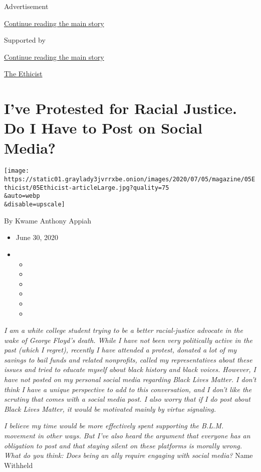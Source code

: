 Advertisement

\protect\hyperlink{after-top}{Continue reading the main story}

Supported by

\protect\hyperlink{after-sponsor}{Continue reading the main story}

\href{/column/the-ethicist}{The Ethicist}

\hypertarget{ive-protested-for-racial-justice-do-i-have-to-post-on-social-media}{%
\section{I've Protested for Racial Justice. Do I Have to Post on Social
Media?}\label{ive-protested-for-racial-justice-do-i-have-to-post-on-social-media}}

\texttt{[image: https://static01.graylady3jvrrxbe.onion/images/2020/07/05/magazine/05Ethicist/05Ethicist-articleLarge.jpg?quality=75\\\&auto=webp\\\&disable=upscale]}

By Kwame Anthony Appiah

\begin{itemize}
\item
  June 30, 2020
\item
  \begin{itemize}
  \item
  \item
  \item
  \item
  \item
  \item
  \end{itemize}
\end{itemize}

\emph{I am a white college student trying to be a better racial-justice
advocate in the wake of George Floyd's death. While I have not been very
politically active in the past (which I regret), recently I have
attended a protest, donated a lot of my savings to bail funds and
related nonprofits, called my representatives about these issues and
tried to educate myself about black history and black voices. However, I
have not posted on my personal social media regarding Black Lives
Matter. I don't think I have a unique perspective to add to this
conversation, and I don't like the scrutiny that comes with a social
media post. I also worry that if I do post about Black Lives Matter, it
would be motivated mainly by virtue signaling.}

\emph{I believe my time would be more effectively spent supporting the
B.L.M. movement in other ways. But I've also heard the argument that
everyone has an obligation to post and that staying silent on these
platforms is morally wrong. What do you think: Does being an ally
require engaging with social media?} Name Withheld

